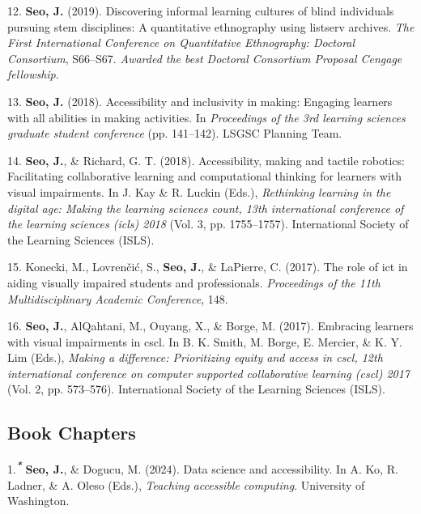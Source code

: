 \documentclass[11pt,a4paper,]{awesome-cv}
\begin{document}
\leavevmode\hypertarget{ref-seo2019discovering}{}%
12. \textbf{Seo, J.} (2019). Discovering informal learning cultures of
blind individuals pursuing stem disciplines: A quantitative ethnography
using listserv archives. \emph{The First International Conference on
  Quantitative Ethnography: Doctoral Consortium}, S66--S67. \emph{Awarded
  the best Doctoral Consortium Proposal Cengage fellowship}.

\leavevmode\hypertarget{ref-seo2018making}{}%
13. \textbf{Seo, J.} (2018). Accessibility and inclusivity in making:
Engaging learners with all abilities in making activities. In
\emph{Proceedings of the 3rd learning sciences graduate student
  conference} (pp. 141--142). LSGSC Planning Team.

\leavevmode\hypertarget{ref-seo2018accessibility}{}%
14. \textbf{Seo, J.}, \& Richard, G. T. (2018). Accessibility, making
and tactile robotics: Facilitating collaborative learning and
computational thinking for learners with visual impairments. In J. Kay
\& R. Luckin (Eds.), \emph{Rethinking learning in the digital age:
  Making the learning sciences count, 13th international conference of the
  learning sciences (icls) 2018} (Vol. 3, pp. 1755--1757). International
Society of the Learning Sciences (ISLS).

\leavevmode\hypertarget{ref-konecki2017role}{}%
15. Konecki, M., Lovrenčić, S., \textbf{Seo, J.}, \& LaPierre, C.
(2017). The role of ict in aiding visually impaired students and
professionals. \emph{Proceedings of the 11th Multidisciplinary Academic
  Conference}, 148.

\leavevmode\hypertarget{ref-seo2017embracing}{}%
16. \textbf{Seo, J.}, AlQahtani, M., Ouyang, X., \& Borge, M. (2017).
Embracing learners with visual impairments in cscl. In B. K. Smith, M.
Borge, E. Mercier, \& K. Y. Lim (Eds.), \emph{Making a difference:
  Prioritizing equity and access in cscl, 12th international conference on
  computer supported collaborative learning (cscl) 2017} (Vol. 2, pp.
573--576). International Society of the Learning Sciences (ISLS).

\hypertarget{book-chapters}{%
  \subsection{Book Chapters}\label{book-chapters}}

\hypertarget{bibliography}{}
\leavevmode\hypertarget{ref-SeoDogucu2023}{}%
1.\textsuperscript{\emph{\textbf{*}}} \textbf{Seo, J.}, \& Dogucu, M.
(2024). Data science and accessibility. In A. Ko, R. Ladner, \& A. Oleso
(Eds.), \emph{Teaching accessible computing}. University of Washington.
\end{document}
